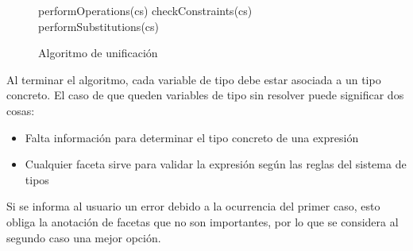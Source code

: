 \begin{figure}[ht]
  \centering
  \label{pseudouni}
  \begin{mdframed}
    \begin{algorithmic}
            \State performOperations(cs)
            \State checkConstraints(cs)
            \State performSubstitutions(cs)
          \EndWhile
      \EndFunction
    \end{algorithmic}
  \end{mdframed}
  \caption{Algoritmo de unificación}
\end{figure}

Al terminar el algoritmo, cada variable de tipo debe estar asociada a un tipo concreto. El caso de que queden variables de tipo sin resolver puede significar dos cosas:

\begin{itemize}
  \item Falta información para determinar el tipo concreto de una expresión
  \item Cualquier faceta sirve para validar la expresión según las reglas del sistema de tipos
\end{itemize}

Si se informa al usuario un error debido a la ocurrencia del primer caso, esto obliga la anotación de facetas que no son importantes, por lo que se considera al segundo caso una mejor opción.
